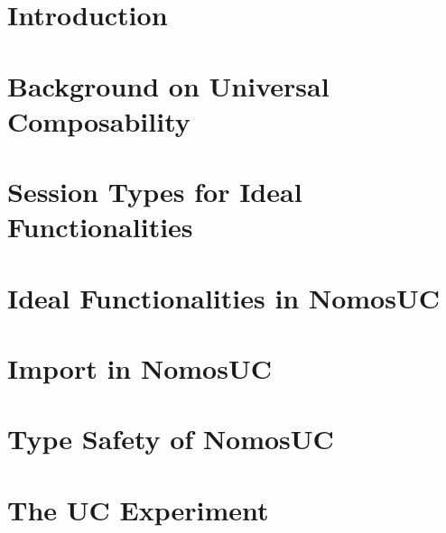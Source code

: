 \documentclass[conference]{IEEEtran}
\begin{document}

\section{Introduction} \label{sec:intro}


\section{Background on Universal Composability} \label{sec:background}


\section{Session Types for Ideal Functionalities} 


\section{Ideal Functionalities in NomosUC} \label{sec:example}


\section{Import in NomosUC} \label{sec:motivate}


%
%
%

\section{Type Safety of NomosUC} \label{sec:safety}


\section{The UC Experiment} \label{sec:execuc}


%
\end{document}
